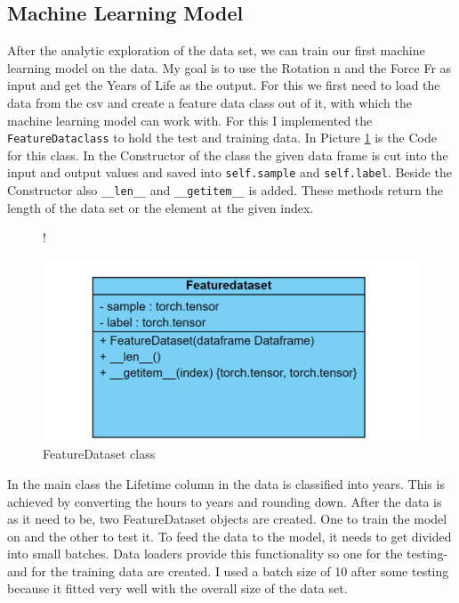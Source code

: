 \documentclass[a4paper, 12pt, oneside]{scrbook}
\begin{document}
			\subsection{Machine Learning Model}
				\noindent After the analytic exploration of the data set, we can train our first machine learning model on the data. My goal is to use the Rotation n and the Force Fr as input and get the Years of Life as the output. For this we first need to load the data from the csv and create a feature data class out of it, with which the machine learning model can work with. For this I implemented the \texttt{FeatureDataclass} to hold the test and training data. In Picture \ref{fig:FeatureDataclass} is the Code for this class. In the Constructor of the class the given data frame is cut into the input and output values and saved into \texttt{self.sample} and \texttt{self.label}. Beside the Constructor also \texttt{\_\_len\_\_} and \texttt{\_\_getitem\_\_} is added. These methods return the length of the data set or the element at the given index.
				
				\begin{figure} [H]
					\centering
					\resizebox{\linewidth} {!} {
						\includegraphics{res/firstEDA/feature_dataset.png}
						
					}
					\caption{FeatureDataset class}
					\label{fig:FeatureDataclass}
				\end{figure}
				
				\noindent In the main class the Lifetime column in the data is classified into years. This is achieved by converting the hours to years and rounding down. After the data is as it need to be, two FeatureDataset objects are created. One to train the model on and the other to test it. To feed the data to the model, it needs to get divided into small batches. Data loaders provide this functionality so one for the testing- and for the training data are created. I used a batch size of 10 after some testing because it fitted very well with the overall size of the data set.
				
\end{document}
